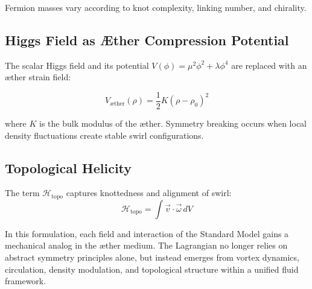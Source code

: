 Fermion masses vary according to knot complexity, linking number, and chirality.

\subsection{Higgs Field as Æther Compression Potential}

The scalar Higgs field and its potential $V(\phi) = \mu^2 \phi^2 + \lambda \phi^4$ are replaced with an æther strain field:

\begin{equation}
V_{\text{æther}}(\rho) = \frac{1}{2}K(\rho - \rho_0)^2
\end{equation}

where $K$ is the bulk modulus of the æther. Symmetry breaking occurs when local density fluctuations create stable swirl configurations.

\subsection{Topological Helicity}

The term $\mathcal{H}_\text{topo}$ captures knottedness and alignment of swirl:
\begin{equation}
\mathcal{H}_\text{topo} = \int \vec{v} \cdot \vec{\omega} \, dV
\end{equation}
\bigskip

In this formulation, each field and interaction of the Standard Model gains a mechanical analog in the æther medium. The Lagrangian no longer relies on abstract symmetry principles alone, but instead emerges from vortex dynamics, circulation, density modulation, and topological structure within a unified fluid framework.


